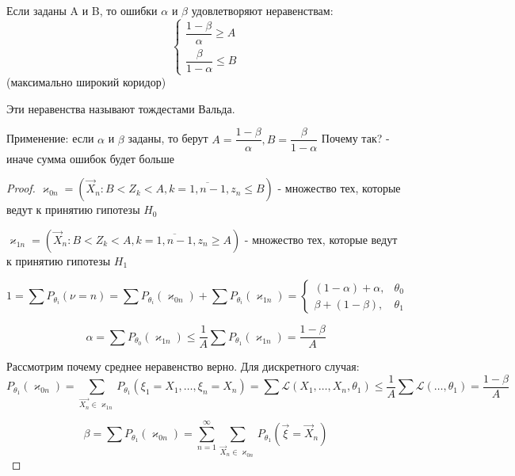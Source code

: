 \begin{theorem}[Вальда]
  Если заданы A и B, то ошибки $\alpha$ и $\beta$ удовлетворяют неравенствам:
  \begin{equation*}
    \begin{cases}
      \dfrac{1 - \beta}{\alpha} \geqslant A \\[1em]
      \dfrac{\beta}{1 - \alpha} \leqslant B
    \end{cases}
  \end{equation*}
  (максимально широкий коридор)

  Эти неравенства называют тождестами Вальда.

\end{theorem}

Применение: если $\alpha$ и $\beta$ заданы, то берут $A = \dfrac{1-\beta}{\alpha}, B = \dfrac{\beta}{1 - \alpha}$
Почему так? - иначе сумма ошибок будет больше

\begin{proof}
  $\varkappa_{0n} = \left( \vec{X}_n : B < Z_k < A, k = \overline{1, n-1}, z_n \leqslant B \right)$ - множество тех, которые ведут к принятию гипотезы $H_0$

  $\varkappa_{1n} = \left( \vec{X}_n : B < Z_k < A, k = \overline{1, n-1}, z_n \geqslant A \right)$ - множество тех, которые ведут к принятию гипотезы $H_1$

  \begin{equation*}
    1 = \sum  P_{\theta_i} (\nu = n) = \sum P_{\theta_i} (\varkappa_{0n}) + \sum P_{\theta_i} (\varkappa_{1n}) =
    \begin{cases}
      (1 - \alpha) + \alpha, &\theta_0 \\
      \beta + (1 - \beta), &\theta_1
    \end{cases} 
  \end{equation*}

  \[
    \alpha = \sum P_{\theta_0} (\varkappa_{1n}) \leqslant \dfrac{1}{A} \sum P_{\theta_1} (\varkappa_{1n}) = \dfrac{1 - \beta}{A}
  \]
  
  Рассмотрим почему среднее неравенство верно. Для дискретного случая:
  \[
    P_{\theta_1} (\varkappa_{0n}) = \sum_{\vec{X_n} \in \varkappa_{1n}} P_{\theta_1}(\xi_1 = X_1, \dots, \xi_n = X_n)= \sum \mathcal{L} (X_1, \dots, X_n, \theta_1) \leqslant \dfrac{1}{A} \sum \mathcal{L} (\dots, \theta_1) = \dfrac{1 - \beta}{A}
  \]

  \[
    \beta = \sum P_{\theta_1} (\varkappa_{0n}) = \sum_{n=1}^\infty \sum_{\vec{X}_n \in \varkappa_{0n}} P_{\theta_1} (\vec{\xi} = \vec{X}_n)
  \]
\end{proof}

